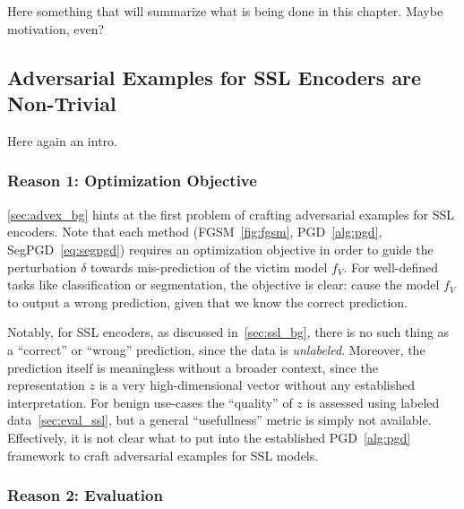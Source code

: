 \chapter{\EmbedAttack}\label{chap:method}

Here something that will summarize what is being done in this chapter. Maybe motivation, even?

\section{Adversarial Examples for SSL Encoders are Non-Trivial}\label{sec:advex_ssl_problems}

Here again an intro.

\subsection{Reason 1: Optimization Objective}

\cref{sec:advex_bg} hints at the first problem of crafting adversarial examples for SSL encoders. Note that each method (FGSM~\cref{fig:fgsm}, PGD~\cref{alg:pgd}, SegPGD~\cref{eq:segpgd}) requires an optimization objective in order to guide the perturbation $\delta$ towards mis-prediction of the victim model $f_V$. For well-defined tasks like classification or segmentation, the objective is clear: cause the model $f_V$ to output a wrong prediction, given that we know the correct prediction.

Notably, for SSL encoders, as discussed in~\cref{sec:ssl_bg}, there is no such thing as a ``correct'' or ``wrong'' prediction, since the data is \textit{unlabeled}. Moreover, the prediction itself is meaningless without a broader context, since the representation $z$ is a very high-dimensional vector without any established interpretation. For benign use-cases the ``quality'' of $z$ is assessed using labeled data~\cref{sec:eval_ssl}, but a general ``usefullness'' metric is simply not available. Effectively, it is not clear what to put into the established PGD~\cref{alg:pgd} framework to craft adversarial examples for SSL models.

\subsection{Reason 2: Evaluation}

